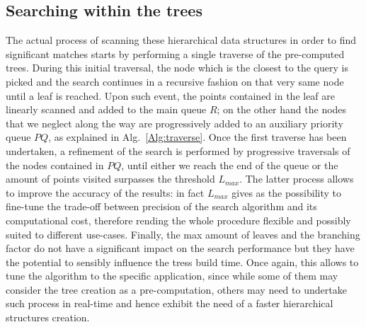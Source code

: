 \documentclass[a4paper, 11pt, oneside]{article}
\begin{document}
\subsection*{Searching within the trees}
The actual process of scanning these hierarchical data structures in order to find significant matches starts by performing a single traverse of the pre-computed trees. During this initial traversal, the node which is the closest to the query is picked and the search continues in a recursive fashion on that very same node until a leaf is reached. Upon such event, the points contained in the leaf are linearly scanned and added to the main queue $R$; on the other hand the nodes that we neglect along the way are progressively added to an auxiliary priority queue $PQ$, as explained in Alg.~\ref{Alg:traverse}. Once the first traverse has been undertaken, a refinement of the search is performed by progressive traversals of the nodes contained in $PQ$, until either we reach the end of the queue or the amount of points visited surpasses the threshold $L_{max}$. The latter process allows to improve the accuracy of the results: in fact $L_{max}$ gives as the possibility to fine-tune the trade-off between precision of the search algorithm and its computational cost, therefore rending the whole procedure flexible and possibly suited to different use-cases. Finally, the max amount of leaves and the branching factor do not have a significant impact on the search performance but they have the potential to sensibly influence the tress build time. Once again, this allows to tune the algorithm to the specific application, since while some of them may consider the tree creation as a pre-computation, others may need to undertake such process in real-time and hence exhibit the need of a faster hierarchical structures creation.
\end{document}
